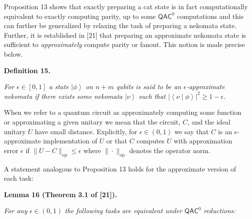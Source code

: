 \documentclass[10pt,a4paper]{article}
\begin{document}
Proposition 13 shows that exactly preparing a cat state is in fact computationally equivalent to exactly computing parity, up to some ${\mathsf{QAC}}^{0}$ computations and this can further be generalized by relaxing the task of preparing a nekomata state.
Further, it is established in [21] that preparing an approximate nekomata state is sufficient to \emph{approximately} compute parity or fanout. This notion is made precise below.\par





\par\medskip\noindent\textbf{
\textbf{Definition 15}\textbf{.}
}\par



\emph{For $\epsilon\in[0,1]$ a state $\left|\phi\right\rangle$ on $n+m$ qubits is said to be an $\epsilon$-approximate nekomata if there exists some nekomata $\left|\nu\right\rangle$ such that $\left|\left\langle\nu\middle|\phi\right\rangle\right|^{2}\geq 1-\epsilon$.}\par






When we refer to a quantum circuit as approximately computing some function or approximating a given unitary we mean that the circuit, $C$, and the ideal unitary $U$ have small distance. Explicitly, for $\epsilon\in(0,1)$ we say that $C$ is an $\epsilon$-approximate implementation of $U$ or that $C$ computes $U$ with approximation error $\epsilon$ if $\|U-C\|_{\mathrm{op}}\leq\epsilon$ where $\|\cdot\|_{\mathrm{op}}$ denotes the operator norm.\par




A statement analogous to Proposition 13 holds for the approximate version of each task:\par





\par\medskip\noindent\textbf{
\textbf{Lemma 16}\textbf{ }(Theorem 3.1 of [21])\textbf{.}
}\par



\emph{For any $\epsilon\in(0,1)$ the following tasks are equivalent under ${\mathsf{QAC}}^{0}$ reductions:}\par
\end{document}
